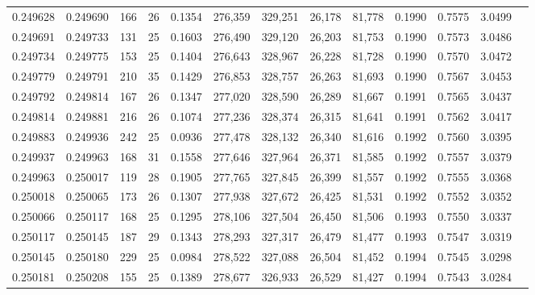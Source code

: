 \begin{tabular}{rrrrrrrrrrrrr}
0.249628 & 0.249690 &   166 &  26 &                                     0.1354 & 276,359 & 329,251 &  26,178 &  81,778 & 0.1990 & 0.7575 & 3.0499 \\
0.249691 & 0.249733 &   131 &  25 &                                     0.1603 & 276,490 & 329,120 &  26,203 &  81,753 & 0.1990 & 0.7573 & 3.0486 \\
0.249734 & 0.249775 &   153 &  25 &                                     0.1404 & 276,643 & 328,967 &  26,228 &  81,728 & 0.1990 & 0.7570 & 3.0472 \\
0.249779 & 0.249791 &   210 &  35 &                                     0.1429 & 276,853 & 328,757 &  26,263 &  81,693 & 0.1990 & 0.7567 & 3.0453 \\
0.249792 & 0.249814 &   167 &  26 &                                     0.1347 & 277,020 & 328,590 &  26,289 &  81,667 & 0.1991 & 0.7565 & 3.0437 \\
0.249814 & 0.249881 &   216 &  26 &                                     0.1074 & 277,236 & 328,374 &  26,315 &  81,641 & 0.1991 & 0.7562 & 3.0417 \\
0.249883 & 0.249936 &   242 &  25 &                                     0.0936 & 277,478 & 328,132 &  26,340 &  81,616 & 0.1992 & 0.7560 & 3.0395 \\
0.249937 & 0.249963 &   168 &  31 &                                     0.1558 & 277,646 & 327,964 &  26,371 &  81,585 & 0.1992 & 0.7557 & 3.0379 \\
0.249963 & 0.250017 &   119 &  28 &                                     0.1905 & 277,765 & 327,845 &  26,399 &  81,557 & 0.1992 & 0.7555 & 3.0368 \\
0.250018 & 0.250065 &   173 &  26 &                                     0.1307 & 277,938 & 327,672 &  26,425 &  81,531 & 0.1992 & 0.7552 & 3.0352 \\
0.250066 & 0.250117 &   168 &  25 &                                     0.1295 & 278,106 & 327,504 &  26,450 &  81,506 & 0.1993 & 0.7550 & 3.0337 \\
0.250117 & 0.250145 &   187 &  29 &                                     0.1343 & 278,293 & 327,317 &  26,479 &  81,477 & 0.1993 & 0.7547 & 3.0319 \\
0.250145 & 0.250180 &   229 &  25 &                                     0.0984 & 278,522 & 327,088 &  26,504 &  81,452 & 0.1994 & 0.7545 & 3.0298 \\
0.250181 & 0.250208 &   155 &  25 &                                     0.1389 & 278,677 & 326,933 &  26,529 &  81,427 & 0.1994 & 0.7543 & 3.0284 \\

\end{tabular}

